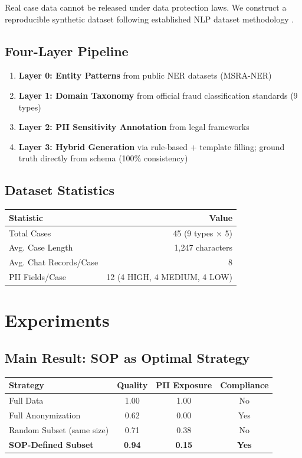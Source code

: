 \documentclass[letterpaper]{article}
\begin{document}
Real case data cannot be released under data protection laws. We construct a reproducible synthetic dataset following established NLP dataset methodology \citep{yao2019docred,zhou2023fewie}.

\subsection{Four-Layer Pipeline}

\begin{enumerate}
    \item \textbf{Layer 0: Entity Patterns} from public NER datasets (MSRA-NER)
    \item \textbf{Layer 1: Domain Taxonomy} from official fraud classification standards (9 types)
    \item \textbf{Layer 2: PII Sensitivity Annotation} from legal frameworks
    \item \textbf{Layer 3: Hybrid Generation} via rule-based + template filling; ground truth directly from schema (100\% consistency)
\end{enumerate}

\subsection{Dataset Statistics}

\begin{center}
\begin{tabular}{lr}
\toprule
\textbf{Statistic} & \textbf{Value} \\
\midrule
Total Cases & 45 (9 types $\times$ 5) \\
Avg. Case Length & 1,247 characters \\
Avg. Chat Records/Case & 8 \\
PII Fields/Case & 12 (4 HIGH, 4 MEDIUM, 4 LOW) \\
\bottomrule
\end{tabular}
\end{center}

\section{Experiments}

\subsection{Main Result: SOP as Optimal Strategy}

\begin{center}
\begin{tabular}{lccc}
\toprule
\textbf{Strategy} & \textbf{Quality} & \textbf{PII Exposure} & \textbf{Compliance} \\
\midrule
Full Data & 1.00 & 1.00 & No \\
Full Anonymization & 0.62 & 0.00 & Yes \\
Random Subset (same size) & 0.71 & 0.38 & No \\
\textbf{SOP-Defined Subset} & \textbf{0.94} & \textbf{0.15} & \textbf{Yes} \\
\bottomrule
\end{tabular}
\end{center}
\end{document}
